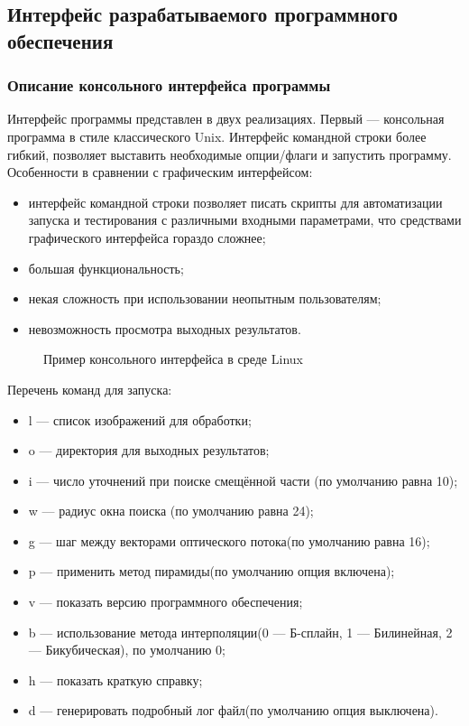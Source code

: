 \subsection {Интерфейс разрабатываемого программного обеспечения}
\subsubsection{Описание консольного интерфейса программы}%
Интерфейс программы представлен в двух реализациях.
Первый — консольная программа в стиле классического Unix. Интерфейс командной строки более гибкий, позволяет выставить необходимые опции/флаги и запустить программу. Особенности в сравнении с графическим интерфейсом:
\begin{itemize}
\item интерфейс командной строки позволяет писать скрипты для автоматизации запуска и тестирования с различными входными параметрами, что средствами графического интерфейса гораздо сложнее;
\item большая функциональность;
\item некая сложность при использовании неопытным пользователям;
\item невозможность просмотра выходных результатов.
\end{itemize}

\begin{figure}[ht]
\caption{Пример консольного интерфейса в среде Linux}
\label{pic:con_scr}
\end{figure}

Перечень команд для запуска:
\begin{itemize}
\item l — список изображений для обработки;
\item o — директория для выходных результатов;
\item i — число уточнений при поиске смещённой части (по умолчанию равна 10);
\item w — радиус окна поиска (по умолчанию равна 24);
\item g — шаг между векторами оптического потока(по умолчанию равна 16);
\item p — применить метод пирамиды(по умолчанию опция включена);
\item v — показать версию программного обеспечения;
\item b — использование метода интерполяции(0 — Б-сплайн, 1 — Билинейная, 2 — Бикубическая), по умолчанию 0;
\item h — показать краткую справку;
\item d — генерировать подробный лог файл(по умолчанию опция выключена).
\end{itemize}
